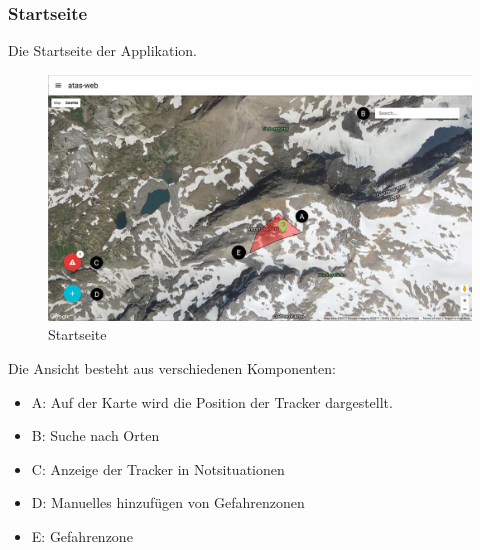 \documentclass[11pt,english,german]{report}
\theoremstyle{definition}
\begin{document}
\subsubsection{Startseite}
Die Startseite der Applikation.
\begin{figure}[H]
	\centering
	\includegraphics[width=\textwidth]{img/atasweb/atas-web.jpg}
	\caption[Startseite]
	{Startseite}
\end{figure}
Die Ansicht besteht aus verschiedenen Komponenten:
\begin{itemize}
	\item A: Auf der Karte wird die Position der Tracker dargestellt. 
	\item B: Suche nach Orten
	\item C: Anzeige der Tracker in Notsituationen
	\item D: Manuelles hinzufügen von Gefahrenzonen
	\item E: Gefahrenzone
\end{itemize}

\newpage
\end{document}
